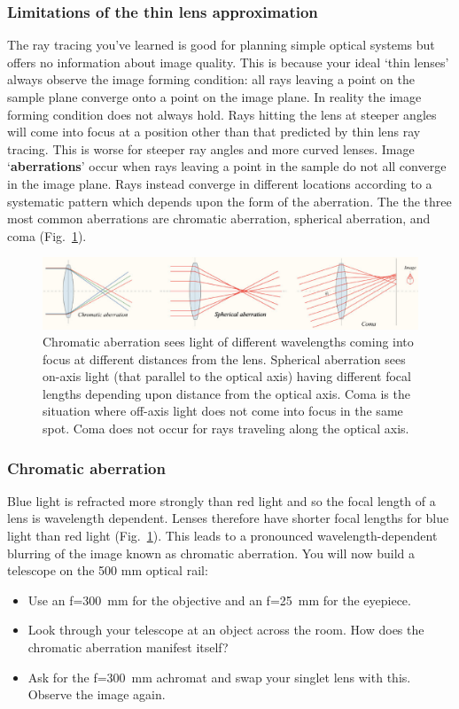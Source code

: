 \documentclass[a4paper]{report}
\begin{document}
\subsubsection{Limitations of the thin lens approximation}
The ray tracing you've learned is good for planning simple optical systems but offers no information about image quality. 
This is because your ideal `thin lenses' always observe the image forming condition: all rays leaving a point on the sample plane converge onto a point on the image plane. 
In reality the image forming condition does not always hold. 
Rays hitting the lens at steeper angles will come into focus at a position other than that predicted by thin lens ray tracing. 
This is worse for steeper ray angles and more curved lenses. 
Image `\textbf{aberrations}' occur when rays leaving a point in the sample do not all converge in the image plane.
Rays instead converge in different locations according to a systematic pattern which depends upon the form of the aberration. 
The the three most common aberrations are chromatic aberration, spherical aberration, and coma (Fig.~\ref{fig:aberrations}). 

\begin{figure}[h]
\center
\includegraphics[width=6in]{aberrations.eps}
\caption{ 
Chromatic aberration sees light of different wavelengths coming into focus at different distances from the lens.
Spherical aberration sees on-axis light (that parallel to the optical axis) having different focal lengths depending upon distance from the optical axis. 
Coma is the situation where off-axis light does not come into focus in the same spot. Coma does not occur for rays traveling along the optical axis.}
\label{fig:aberrations}
\end{figure}



\subsubsection{Chromatic aberration}
Blue light is refracted more strongly than red light and so the focal length of a lens is wavelength dependent. 
Lenses therefore have shorter focal lengths for blue light than red light (Fig.~\ref{fig:aberrations}).
This leads to a pronounced wavelength-dependent blurring of the image known as chromatic aberration. 
You will now build a telescope on the 500 mm optical rail:
\begin{itemize}
\item Use an f=300~mm for the objective and an f=25~mm for the eyepiece. 
\item Look through your telescope at an object across the room. How does the chromatic aberration manifest itself?
\item Ask for the f=300~mm achromat and swap your singlet lens with this. Observe the image again.
\end{itemize}
\end{document}
